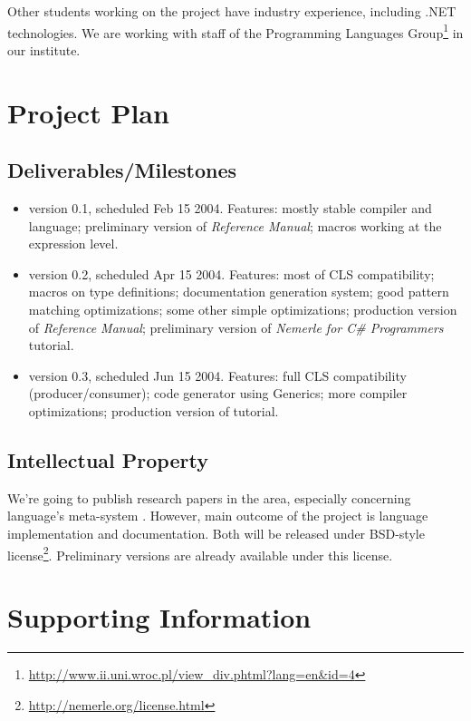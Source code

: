 \documentclass[a4paper,11pt]{article}
\begin{document}
Other students working on the project have industry experience, including
.NET technologies. We are working with staff of the Programming Languages
Group\footnote{\url{http://www.ii.uni.wroc.pl/view_div.phtml?lang=en&id=4}}
in our institute.

\section{Project Plan}

\subsection{Deliverables/Milestones}
\begin{itemize}
\item version 0.1, scheduled Feb 15 2004. Features:
  mostly stable compiler and language;
  preliminary version of \textit{Reference Manual}; 
  macros working at the expression level.

\item version 0.2, scheduled Apr 15 2004. Features:
  most of CLS compatibility;
  macros on type definitions;
  documentation generation system;
  good pattern matching optimizations;
  some other simple optimizations;
  production version of \textit{Reference Manual};
  preliminary version of \textit{Nemerle for C\# Programmers} tutorial.
  
\item version 0.3, scheduled Jun 15 2004. Features:
  full CLS compatibility (producer/consumer);
  code generator using Generics;
  more compiler optimizations;
  production version of tutorial.
\end{itemize}


\subsection{Intellectual Property}

We're going to publish research papers in the area, especially concerning
language's meta-system \cite{Macros}. However, main outcome of the project
is language implementation and documentation. Both will be released
under BSD-style license\footnote{\url{http://nemerle.org/license.html}}.
Preliminary versions are already available under this license.


\section{Supporting Information}
\end{document}
